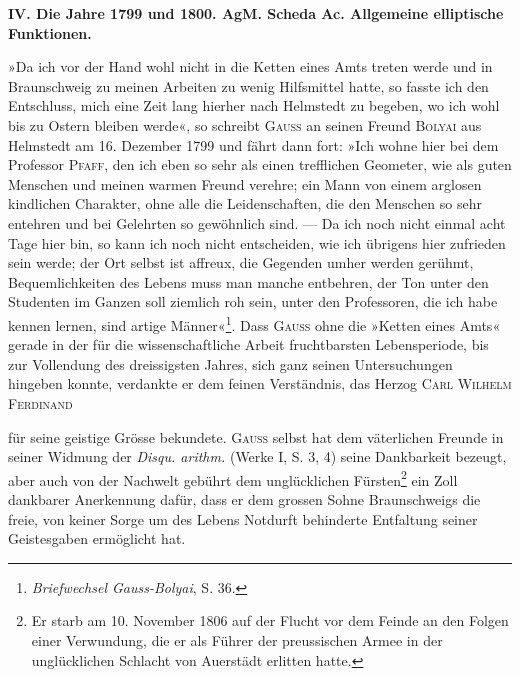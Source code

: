 \par\medskip
\begin{center}\bfseries IV. Die Jahre 1799 und 1800. AgM. Scheda Ac. Allgemeine elliptische Funktionen.\end{center}
\begin{center}\end{center}
\indent »Da ich vor der Hand wohl nicht in die Ketten eines Amts treten werde
und in Braunschweig zu meinen Arbeiten zu wenig Hilfsmittel hatte, so fasste
ich den Entschluss, mich eine Zeit lang hierher nach Helmstedt zu begeben,
wo ich wohl bis zu Ostern bleiben werde«, so schreibt \textsc{Gauss} an seinen Freund
\textsc{Bolyai} aus Helmstedt am 16. Dezember 1799 und fährt dann fort: »Ich wohne
hier bei dem Professor \textsc{Pfaff}, den ich eben so sehr als einen trefflichen Geometer,
wie als guten Menschen und meinen warmen Freund verehre; ein
Mann von einem arglosen kindlichen Charakter, ohne alle die Leidenschaften,
die den Menschen so sehr entehren und bei Gelehrten so gewöhnlich sind.
— Da ich noch nicht einmal acht Tage hier bin, so kann ich noch nicht
entscheiden, wie ich übrigens hier zufrieden sein werde; der Ort selbst ist
affreux, die Gegenden umher werden gerühmt, Bequemlichkeiten des Lebens
muss man manche entbehren, der Ton unter den Studenten im Ganzen soll
ziemlich roh sein, unter den Professoren, die ich habe kennen lernen, sind
artige Männer«\footnote{\textit{Briefwechsel Gauss-Bolyai}, S. 36.}. Dass \textsc{Gauss} ohne die »Ketten eines Amts« gerade in der
für die wissenschaftliche Arbeit fruchtbarsten Lebensperiode, bis zur Vollendung
des dreissigsten Jahres, sich ganz seinen Untersuchungen hingeben konnte,
verdankte er dem feinen Verständnis, das Herzog \textsc{Carl Wilhelm Ferdinand}\par
\clearpage{}
\noindent für seine geistige Grösse bekundete. \textsc{Gauss} selbst hat dem väterlichen Freunde
in seiner Widmung der \textit{Disqu. arithm.} (Werke I, S. 3, 4) seine Dankbarkeit
bezeugt, aber auch von der Nachwelt gebührt dem unglücklichen Fürsten\footnote{Er starb am 10. November 1806 auf der Flucht vor dem Feinde an den Folgen einer Verwundung, die er als Führer der preussischen Armee in der unglücklichen Schlacht von Auerstädt erlitten hatte.}
ein Zoll dankbarer Anerkennung dafür, dass er dem grossen Sohne Braunschweigs
die freie, von keiner Sorge um des Lebens Notdurft behinderte Entfaltung
seiner Geistesgaben ermöglicht hat.

